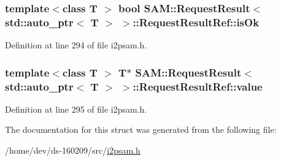 \subsubsection[{is\+Ok}]{\setlength{\rightskip}{0pt plus 5cm}template$<$class T $>$ bool {\bf S\+A\+M\+::\+Request\+Result}$<$ std\+::auto\+\_\+ptr$<$ T $>$ $>$\+::Request\+Result\+Ref\+::is\+Ok}\label{struct_s_a_m_1_1_request_result_3_01std_1_1auto__ptr_3_01_t_01_4_01_4_1_1_request_result_ref_a4b7e2f67bbf2fabc397502103c5691a2}


Definition at line 294 of file i2psam.\+h.

\hypertarget{struct_s_a_m_1_1_request_result_3_01std_1_1auto__ptr_3_01_t_01_4_01_4_1_1_request_result_ref_aee098e22085d344364e61ee5ced56d71}{}
\subsubsection[{value}]{\setlength{\rightskip}{0pt plus 5cm}template$<$class T $>$ T$\ast$ {\bf S\+A\+M\+::\+Request\+Result}$<$ std\+::auto\+\_\+ptr$<$ T $>$ $>$\+::Request\+Result\+Ref\+::value}\label{struct_s_a_m_1_1_request_result_3_01std_1_1auto__ptr_3_01_t_01_4_01_4_1_1_request_result_ref_aee098e22085d344364e61ee5ced56d71}


Definition at line 295 of file i2psam.\+h.



The documentation for this struct was generated from the following file\+:\begin{DoxyCompactItemize}
\item 
/home/dev/ds-\/160209/src/\hyperlink{i2psam_8h}{i2psam.\+h}\end{DoxyCompactItemize}
